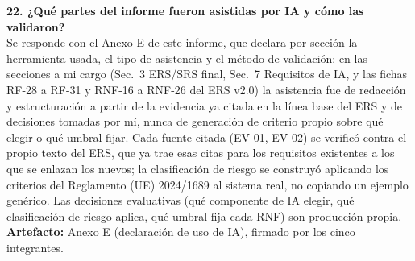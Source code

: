 \medskip
\noindent\textbf{22. ¿Qué partes del informe fueron asistidas por IA y cómo las validaron?}\\
Se responde con el Anexo E de este informe, que declara por sección la herramienta usada, el tipo de asistencia y el método de validación: en las secciones a mi cargo (Sec.~3 ERS/SRS final, Sec.~7 Requisitos de IA, y las fichas RF-28 a RF-31 y RNF-16 a RNF-26 del ERS v2.0) la asistencia fue de redacción y estructuración a partir de la evidencia ya citada en la línea base del ERS y de decisiones tomadas por mí, nunca de generación de criterio propio sobre qué elegir o qué umbral fijar. Cada fuente citada (EV-01, EV-02) se verificó contra el propio texto del ERS, que ya trae esas citas para los requisitos existentes a los que se enlazan los nuevos; la clasificación de riesgo se construyó aplicando los criterios del Reglamento (UE) 2024/1689 al sistema real, no copiando un ejemplo genérico. Las decisiones evaluativas (qué componente de IA elegir, qué clasificación de riesgo aplica, qué umbral fija cada RNF) son producción propia. \textbf{Artefacto:} Anexo E (declaración de uso de IA), firmado por los cinco integrantes.
